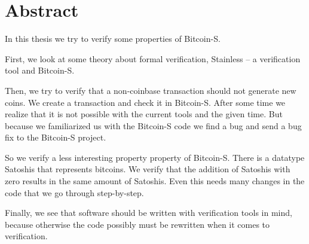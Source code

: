 \chapter*{Abstract}
\label{chap:abstract}

In this thesis we try to verify some properties of Bitcoin-S.

First, we look at some theory about formal verification, Stainless -- a verification tool and Bitcoin-S.

Then, we try to verify that a non-coinbase transaction should not generate new coins.
We create a transaction and check it in Bitcoin-S.
After some time we realize that it is not possible with the current tools and the given time.
But because we familiarized us with the Bitcoin-S code we find a bug and send a bug fix to the Bitcoin-S project.

So we verify a less interesting property property of Bitcoin-S.
There is a datatype Satoshis that represents bitcoins. We verify that the addition of Satoshis with zero results in the same amount of Satoshis.
Even this needs many changes in the code that we go through step-by-step.

Finally, we see that software should be written with verification tools in mind, because otherwise the code possibly must be rewritten when it comes to verification.
